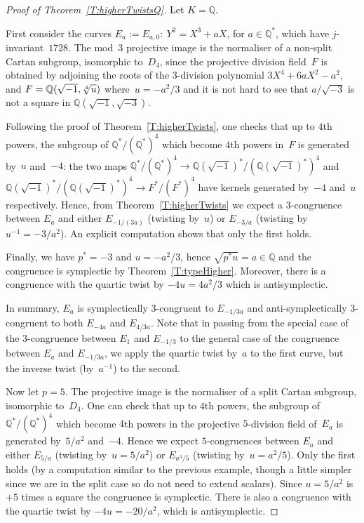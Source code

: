 \documentclass[twoside,leqno,symbols-for-thanks, draft]{rmi}
\numberwithin{equation}{section}
\newcommand{\Q}{\mathbb{Q}}
\theoremstyle{remark}
\begin{document}
\begin{proof}[Proof of Theorem~\ref{T:higherTwistsQ}] Let $K=\Q$.

First consider the curves $E_a := E_{a,0}:\ Y^2=X^3+aX$, for $a \in
\Q^*$, which have $j$-invariant~$1728$.  The mod~$3$ projective image
is the normaliser of a non-split Cartan subgroup, isomorphic to~$D_4$, since
the projective division field~$F$ is obtained by adjoining the roots
of the $3$-division polynomial $3X^4+6aX^2-a^2$, and
$F=\Q(\sqrt{-1},\root4\of u)$ where~$u=-a^2/3$ and it is not hard to
see that $a/\sqrt{-3}$ is not a square in $\Q(\sqrt{-1},\sqrt{-3})$.

Following the proof of Theorem~\ref{T:higherTwists}, one checks
that up to $4$th powers, the subgroup of $\Q^*/(\Q^*)^4$ which become
$4$th powers in~$F$ is generated by~$u$ and~$-4$: the two maps
$\Q^*/(\Q^*)^4 \to \Q(\sqrt{-1})^*/(\Q(\sqrt{-1})^*)^4$ and
$\Q(\sqrt{-1})^*/(\Q(\sqrt{-1})^*)^4 \to F^*/(F^*)^4$ have kernels
generated by~$-4$ and~$u$ respectively.  Hence, from
Theorem~\ref{T:higherTwists} we expect a $3$-congruence between
$E_a$ and either $E_{-1/(3a)}$ (twisting by~$u$) or $E_{-3/a}$
(twisting by~$u^{-1}=-3/a^2$).  An explicit computation shows that
only the first holds.

Finally, we have $p^* = -3$ and $u=-a^2/3$, hence $\sqrt{p^*u} = a \in
\Q$ and the congruence is symplectic by Theorem~\ref{T:typeHigher}.
Moreover, there is a congruence with the quartic twist by $-4u=4a^2/3$
which is antisymplectic.

In summary, $E_a$ is symplectically $3$-congruent to $E_{-1/3a}$ and
anti-symplectically $3$-congruent to both $E_{-4a}$ and $E_{4/3a}$.
Note that in passing from the special case of the $3$-congruence
between $E_1$ and $E_{-1/3}$ to the general case of the congruence
between $E_{a}$ and $E_{-1/3a}$, we apply the quartic twist by~$a$ to
the first curve, but the inverse twist (by~$a^{-1}$) to the second.

Now let $p=5$.  The projective image is the normaliser of a split
Cartan subgroup, isomorphic to~$D_4$.  One can check that up to $4$th powers,
the subgroup of $\Q^*/(\Q^*)^4$ which become $4$th powers in the
projective $5$-division field of~$E_a$ is generated by~$5/a^2$
and~$-4$.  Hence we expect $5$-congruences between $E_a$ and either
$E_{5/a}$ (twisting by~$u=5/a^2$) or $E_{a^3/5}$ (twisting
by~$u=a^2/5$).  Only the first holds (by a computation similar to the
previous example, though a little simpler since we are in the split
case so do not need to extend scalars).  Since $u=5/a^2$ is $+5$ times
a square the congruence is symplectic.  There is also a congruence
with the quartic twist by $-4u=-20/a^2$, which is antisymplectic.


\end{proof}
\end{document}

